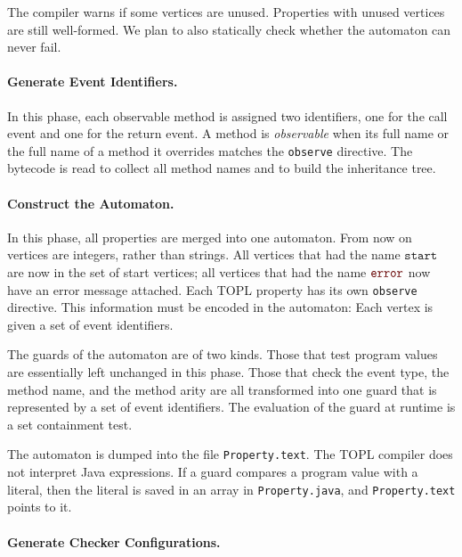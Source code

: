 \documentclass[10pt, preprint]{sigplanconf} %
\newcommand{\error}{\ensuremath{\textcolor{darkred}{\mathtt{error}}}\xspace}
\newcommand{\start}{\ensuremath{\mathtt{start}}\xspace}
\begin{document}
The compiler warns if some vertices are unused.
Properties with unused vertices are still well-formed.
We plan to also statically check whether the automaton can never fail.

\paragraph{Generate Event Identifiers.}

In this phase, each observable method is assigned two identifiers, one for the call event and one for the return event.
A method is \emph{observable} when its full name or the full name of a method it overrides matches the {\tt observe} directive.
The bytecode is read to collect all method names and to build the inheritance tree.

\paragraph{Construct the Automaton.}

In this phase, all properties are merged into one automaton.
From now on vertices are integers, rather than strings.
All vertices that had the name \start are now in the set of start vertices;
all vertices that had the name \error now have an error message attached.
Each TOPL property has its own {\tt observe} directive.
This information must be encoded in the automaton:
Each vertex is given a set of event identifiers.

The guards of the automaton are of two kinds.
Those that test program values are essentially left unchanged in this phase.
Those that check the event type, the method name, and the method arity are all transformed into one guard that is represented by a set of event identifiers.
The evaluation of the guard at runtime is a set containment test.

The automaton is dumped into the file {\tt Property.text}.
The TOPL compiler does not interpret Java expressions.
If a guard compares a program value with a literal, then the literal is saved in an array in {\tt Property.java}, and {\tt Property.text} points to it.

\paragraph{Generate Checker Configurations.}
\end{document}
